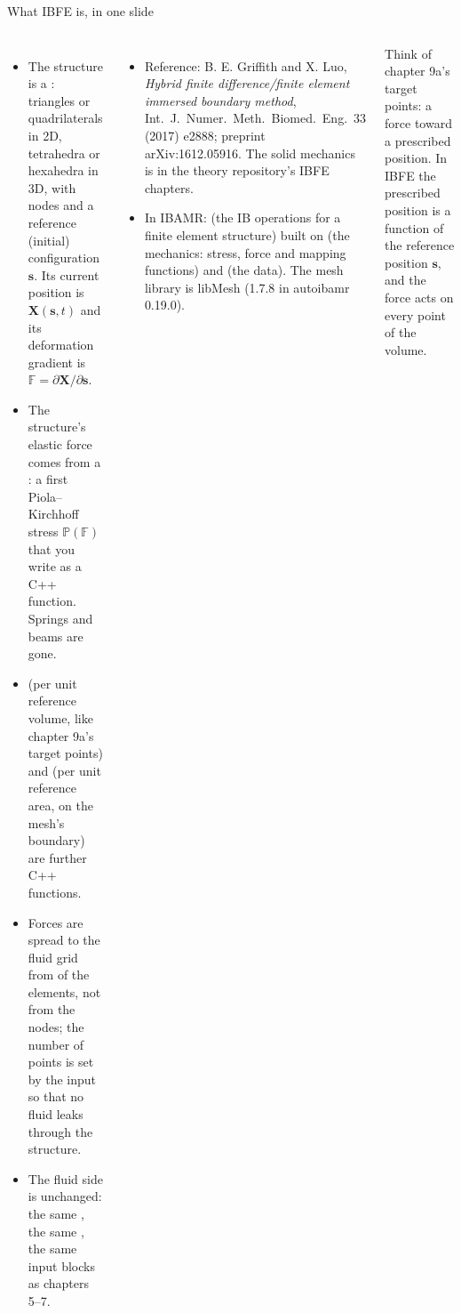 \documentclass[aspectratio=169,11pt]{beamer}
\begin{document}
\begin{frame}{What IBFE is, in one slide}
\label{fr:what}
\scriptsize
\begin{columns}[T]
\begin{itemize}
  \item The structure is a : triangles or quadrilaterals in 2D, tetrahedra or hexahedra in 3D, with nodes and a reference (initial) configuration $\mathbf{s}$. Its current position is $\mathbf{X}(\mathbf{s},t)$ and its deformation gradient is $\mathbb{F} = \partial\mathbf{X}/\partial\mathbf{s}$.
  \item The structure's elastic force comes from a : a first Piola--Kirchhoff stress $\mathbb{P}(\mathbb{F})$ that you write as a C++ function. Springs and beams are gone.
  \item {} (per unit reference volume, like chapter 9a's target points) and  (per unit reference area, on the mesh's boundary) are further C++ functions.
  \item Forces are spread to the fluid grid from  of the elements, not from the nodes; the number of points is set by the input so that no fluid leaks through the structure.
  \item The fluid side is unchanged: the same , the same , the same input blocks as chapters 5--7.
\end{itemize}
\begin{itemize}
  \item Reference: B. E. Griffith and X. Luo, \emph{Hybrid finite difference/finite element immersed boundary method}, Int.\ J.\ Numer.\ Meth.\ Biomed.\ Eng.\ 33 (2017) e2888; preprint arXiv:1612.05916. The solid mechanics is in the theory repository's IBFE chapters.
  \item In IBAMR:  (the IB operations for a finite element structure) built on  (the mechanics: stress, force and mapping functions) and  (the data). The mesh library is libMesh (1.7.8 in autoibamr 0.19.0).
\end{itemize}
\begin{punchbox}
\footnotesize Think of chapter 9a's target points: a force toward a prescribed position. In IBFE the prescribed position is a function of the reference position $\mathbf{s}$, and the force acts on every point of the volume.
\end{punchbox}
\end{columns}
\end{frame}
\end{document}
